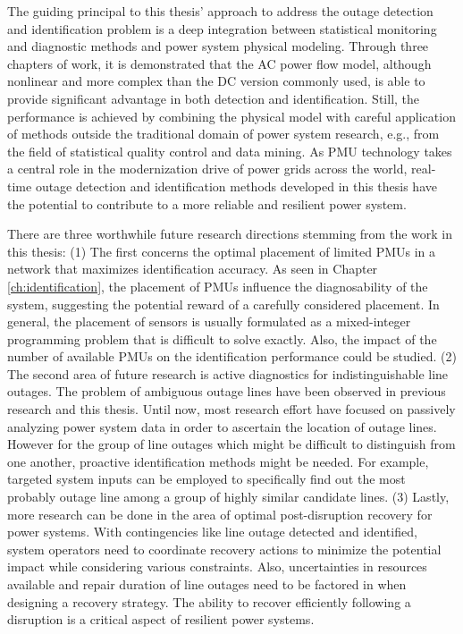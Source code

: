 The guiding principal to this thesis' approach to address the outage detection and identification problem is a deep integration between statistical monitoring and diagnostic methods and power system physical modeling. Through three chapters of work, it is demonstrated that the AC power flow model, although nonlinear and more complex than the DC version commonly used, is able to provide significant advantage in both detection and identification. Still, the performance is achieved by combining the physical model with careful application of methods outside the traditional domain of power system research, e.g., from the field of statistical quality control and data mining. As PMU technology takes a central role in the modernization drive of power grids across the world, real-time outage detection and identification methods developed in this thesis have the potential to contribute to a more reliable and resilient power system. 

There are three worthwhile future research directions stemming from the work in this thesis: (1) The first concerns the optimal placement of limited PMUs in a network that maximizes identification accuracy. As seen in Chapter \ref{ch:identification}, the placement of PMUs influence the diagnosability of the system, suggesting the potential reward of a carefully considered placement. In general, the placement of sensors is usually formulated as a mixed-integer programming problem that is difficult to solve exactly. Also, the impact of the number of available PMUs on the identification performance could be studied. (2) The second area of future research is active diagnostics for indistinguishable line outages. The problem of ambiguous outage lines have been observed in previous research and this thesis. Until now, most research effort have focused on passively analyzing power system data in order to ascertain the location of outage lines. However for the group of line outages which might be difficult to distinguish from one another, proactive identification methods might be needed. For example, targeted system inputs can be employed to specifically find out the most probably outage line among a group of highly similar candidate lines. (3) Lastly, more research can be done in the area of optimal post-disruption recovery for power systems. With contingencies like line outage detected and identified, system operators need to coordinate recovery actions to minimize the potential impact while considering various constraints. Also, uncertainties in resources available and repair duration of line outages need to be factored in when designing a recovery strategy. The ability to recover efficiently following a disruption is a critical aspect of resilient power systems. 


